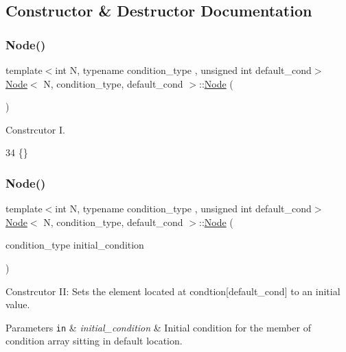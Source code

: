 \subsection{Constructor \& Destructor Documentation}
\mbox{\label{struct_node_a4ada28a6ae351e0507feeb065818bc31}} 
\subsubsection{\texorpdfstring{Node()}{Node()}\hspace{0.1cm}{\footnotesize\ttfamily [1/2]}}
{\footnotesize\ttfamily template$<$int N, typename condition\+\_\+type , unsigned int default\+\_\+cond$>$ \\
\hyperlink{struct_node}{Node}$<$ N, condition\+\_\+type, default\+\_\+cond $>$\+::\hyperlink{struct_node}{Node} (\begin{DoxyParamCaption}{ }\end{DoxyParamCaption})\hspace{0.3cm}{\ttfamily [inline]}}

Constrcutor I. 
\begin{DoxyCode}
34 \{\}
\end{DoxyCode}
\mbox{\label{struct_node_a734cbfa12fda2238fe488eceaae1963a}} 
\subsubsection{\texorpdfstring{Node()}{Node()}\hspace{0.1cm}{\footnotesize\ttfamily [2/2]}}
{\footnotesize\ttfamily template$<$int N, typename condition\+\_\+type , unsigned int default\+\_\+cond$>$ \\
\hyperlink{struct_node}{Node}$<$ N, condition\+\_\+type, default\+\_\+cond $>$\+::\hyperlink{struct_node}{Node} (\begin{DoxyParamCaption}\item[{condition\+\_\+type}]{initial\+\_\+condition }\end{DoxyParamCaption})\hspace{0.3cm}{\ttfamily [inline]}}

Constrcutor II\+: Sets the element located at {\ttfamily condtion}\mbox{[}{\ttfamily default\+\_\+cond}\mbox{]} to an initial value. 
\begin{DoxyParams}[1]{Parameters}
\mbox{\tt in}  & {\em initial\+\_\+condition} & Initial condition for the member of condition array sitting in default location. \\
\hline
\end{DoxyParams}

